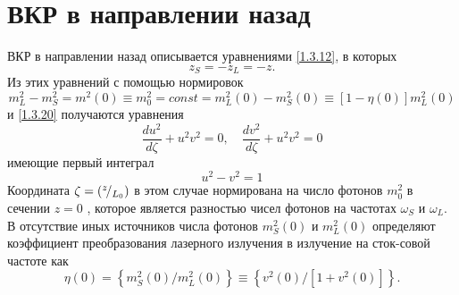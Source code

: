 \documentclass[a4paper]{article}
\begin{document}
\section{ВКР в направлении назад}

ВКР в направлении назад описывается уравнениями \eqref{1.3.12}, в которых 
\begin{equation}
	z_{S}=-z_{L}=-z.
	\label{1.3.23}
\end{equation}
Из этих уравнений с помощью нормировок 
\begin{equation}
	m_{L}^{2}-m_{S}^{2}=m^{2}(0)\equiv m_{0}^{2}=const=m_{L}^{2}(0)-m_{S}^{2}(0)\equiv\left[1-\eta(0)\right]m_{L}^{2}(0)
	\label{1.3.15'''}
	\tag{15'''}
\end{equation}
и \eqref{1.3.20} получаются уравнения
\begin{equation}
	\frac{du^{2}}{d\zeta}+u^{2}v^{2}=0,\quad\frac{dv^{2}}{d\zeta}+u^{2}v^{2}=0
	\label{1.3.24}
\end{equation}
имеющие первый интеграл
\begin{equation}
	u^{2}-v^{2}=1\label{1.3.25}
\end{equation}
Координата $\zeta=({}^{z}\!/_{L_{0}})$ в этом случае  нормирована на число фотонов $m_{0}^{2}$ в сечении $z=0$ , которое является разностью чисел фотонов на частотах $\omega_{S}$ и $\omega_{L}$. В отсутствие иных источников числа фотонов  $m_{S}^{2}(0)$  и $m_{L}^{2}(0)$ определяют коэффициент преобразования лазерного излучения в излучение на сток-совой частоте как
\begin{equation}
	\eta(0)=\left\{m_{S}^{2}(0)/m_{L}^{2}(0)\right\}\equiv\left\{v^{2}(0)/\left[1+v^{2}(0)\right]\right\}.
	\label{1.3.26}
\end{equation}
\end{document}
